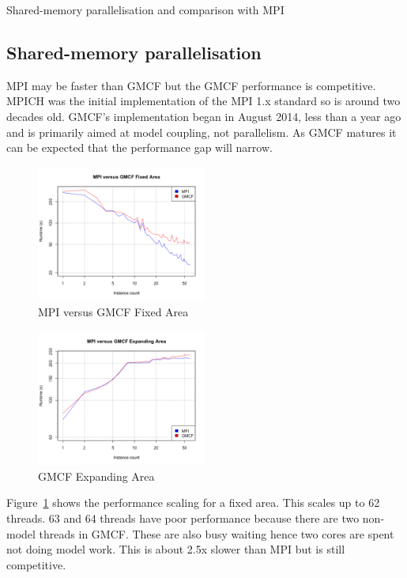 Shared-memory parallelisation and comparison with MPI

\subsection{Shared-memory parallelisation}

MPI may be faster than GMCF but the GMCF performance is competitive. MPICH was
the initial implementation of the MPI 1.x standard so is around two decades old.
GMCF's implementation began in August 2014, less than a year ago and is
primarily aimed at model coupling, not parallelism. As GMCF matures it can be
expected that the performance gap will narrow.

\begin{figure}
    \includegraphics[width=0.5\textwidth]{graphs/GMCF-MPI-fixed-area.png}
    \caption{MPI versus GMCF Fixed Area}
    \label{fig:gmcfmpifixedarea}
\end{figure}

\begin{figure}
    \includegraphics[width=0.5\textwidth]{graphs/GMCF-MPI-expanding-area.png}
    \caption{GMCF Expanding Area}
    \label{fig:gmcfmpiexpandingarea}
\end{figure}

Figure~\ref{fig:gmcfmpifixedarea} shows the performance scaling for a fixed
area. This scales up to 62 threads. 63 and 64 threads have poor performance
because there are two non-model threads in GMCF. These are also busy waiting
hence two cores are spent not doing model work. This is about 2.5x slower than
MPI but is still competitive.

